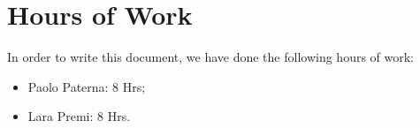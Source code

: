 \documentclass[12pt,a4paper]{article}
\begin{document}
	
	\tableofcontents
	\newpage
	
	
	
	
	\section{Hours of Work}
	In order to write this document, we have done the following hours of work:
	\begin{itemize}
	\item Paolo Paterna: 8 Hrs;
	\item Lara Premi: 8 Hrs.
	\end{itemize}
	\newpage
\end{document}

